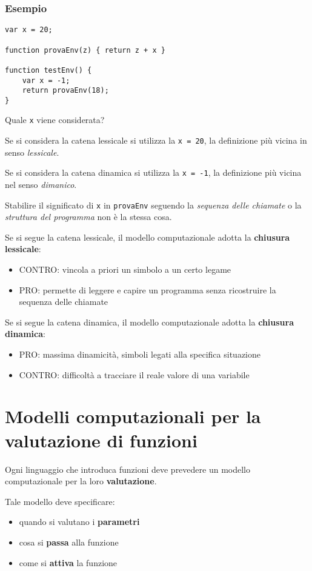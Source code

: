 \subsubsection{Esempio}
\begin{verbatim}
var x = 20;

function provaEnv(z) { return z + x }

function testEnv() {
    var x = -1;
    return provaEnv(18);
}
\end{verbatim}
Quale \texttt{x} viene considerata? 

Se si considera la catena lessicale si utilizza la \texttt{x = 20}, la definizione più vicina in senso \textit{lessicale}.

Se si considera la catena dinamica si utilizza la \texttt{x = -1}, la definizione più vicina nel senso \textit{dimanico}.

Stabilire il significato di \texttt{x} in \texttt{provaEnv} seguendo la \textit{sequenza delle chiamate} o la \textit{struttura del programma} non è la stessa cosa.

Se si segue la catena lessicale, il modello computazionale adotta la \textbf{chiusura lessicale}:
\begin{itemize}
    \item CONTRO: vincola a priori un simbolo a un certo legame
    \item PRO: permette di leggere e capire un programma senza ricostruire la sequenza delle chiamate
\end{itemize}

Se si segue la catena dinamica, il modello computazionale adotta la \textbf{chiusura dinamica}:
\begin{itemize}
    \item PRO: massima dinamicità, simboli legati alla specifica situazione
    \item CONTRO: difficoltà a tracciare il reale valore di una variabile
\end{itemize}

\section{Modelli computazionali per la valutazione di funzioni}
Ogni linguaggio che introduca funzioni deve prevedere un modello computazionale per la loro \textbf{valutazione}.

Tale modello deve specificare:
\begin{itemize}
    \item quando si valutano i \textbf{parametri}
    \item cosa si \textbf{passa} alla funzione
    \item come si \textbf{attiva} la funzione
\end{itemize}

